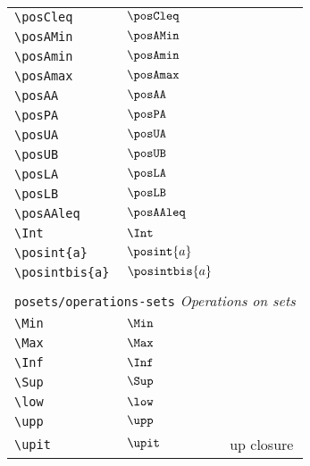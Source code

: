 \begin{longtable}{lll}
 {\color[rgb]{0.5,0.5,0.5}\texttt{\textbackslash posCleq}} & $\posCleq$ & \\ 
 {\color[rgb]{0.5,0.5,0.5}\texttt{\textbackslash posAMin}} & $\posAMin$ & \\ 
 {\color[rgb]{0.5,0.5,0.5}\texttt{\textbackslash posAmin}} & $\posAmin$ & \\ 
 {\color[rgb]{0.5,0.5,0.5}\texttt{\textbackslash posAmax}} & $\posAmax$ & \\ 
 {\color[rgb]{0.5,0.5,0.5}\texttt{\textbackslash posAA}} & $\posAA$ & \\ 
 {\color[rgb]{0.5,0.5,0.5}\texttt{\textbackslash posPA}} & $\posPA$ & \\ 
 {\color[rgb]{0.5,0.5,0.5}\texttt{\textbackslash posUA}} & $\posUA$ & \\ 
 {\color[rgb]{0.5,0.5,0.5}\texttt{\textbackslash posUB}} & $\posUB$ & \\ 
 {\color[rgb]{0.5,0.5,0.5}\texttt{\textbackslash posLA}} & $\posLA$ & \\ 
 {\color[rgb]{0.5,0.5,0.5}\texttt{\textbackslash posLB}} & $\posLB$ & \\ 
 {\color[rgb]{0.5,0.5,0.5}\texttt{\textbackslash posAAleq}} & $\posAAleq$ & \\ 
 {\color[rgb]{0.5,0.5,0.5}\texttt{\textbackslash Int}} & $\Int$ & \\ 
 {\color[rgb]{0.5,0.5,0.5}\texttt{\textbackslash posint\{a\}}} & $\posint{a}$ & \\ 
 {\color[rgb]{0.5,0.5,0.5}\texttt{\textbackslash posintbis\{a\}}} & $\posintbis{a}$ & \\ 
  &  & \\ 
 \multicolumn{3}{l}{{\color[rgb]{0.5,0.5,0.5}\texttt{posets/operations-sets}} \emph{Operations on sets}}\\ 
 \hline
{\color[rgb]{0.5,0.5,0.5}\texttt{\textbackslash Min}} & $\Min$ & \\ 
 {\color[rgb]{0.5,0.5,0.5}\texttt{\textbackslash Max}} & $\Max$ & \\ 
 {\color[rgb]{0.5,0.5,0.5}\texttt{\textbackslash Inf}} & $\Inf$ & \\ 
 {\color[rgb]{0.5,0.5,0.5}\texttt{\textbackslash Sup}} & $\Sup$ & \\ 
 {\color[rgb]{0.5,0.5,0.5}\texttt{\textbackslash low}} & $\low$ & \\ 
 {\color[rgb]{0.5,0.5,0.5}\texttt{\textbackslash upp}} & $\upp$ & \\ 
 {\color[rgb]{0.5,0.5,0.5}\texttt{\textbackslash upit}} & $\upit$ &  up closure\\ 

\end{longtable}
